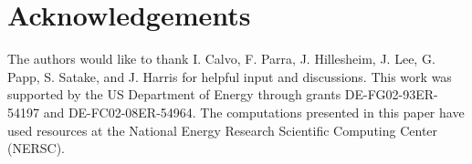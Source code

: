 \documentclass[aip, pop, preprint]{revtex4-1}
\begin{document}
\FloatBarrier

\section*{Acknowledgements}
The authors would like to thank I. Calvo, F. Parra, J. Hillesheim, J. Lee, G. Papp, S. Satake, and J. Harris for helpful input and discussions. This work was supported by the US Department of Energy through grants DE-FG02-93ER-54197 and DE-FC02-08ER-54964. The computations presented in this paper have used resources at the National Energy Research Scientific Computing Center (NERSC). 

\raggedright

\end{document}
